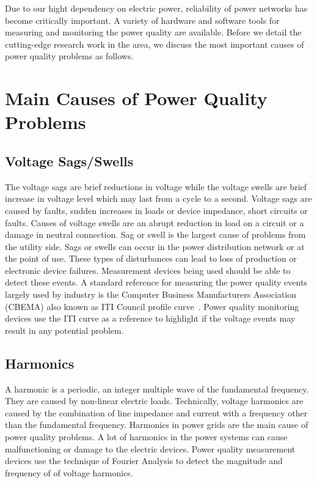 \label{chap:review}
Due to our hight dependency on electric power, reliability of power networks has become critically important. A variety of hardware and software tools for measuring and monitoring the power quality are available. Before we detail the cutting-edge research work in the area, we discuss the most important causes of power quality problems as follows.

\section{Main Causes of Power Quality Problems}
\subsection{Voltage Sags/Swells}
The voltage sags are brief reductions in voltage while the voltage swells are brief increase in voltage level which may last from a cycle to a second. Voltage sags are caused by faults, sudden increases in loads or device impedance, short circuits or faults. Causes of voltage swells are an abrupt reduction in load on a circuit or a damage in neutral connection. Sag or swell is the largest cause of problems from the utility side. Sags or swells can occur in the power distribution network or at the point of use. These types of disturbances can lead to loss of production or electronic device failures. Measurement devices being used should be able to detect these events. A standard reference for measuring the power quality events largely used by industry is the Computer Business Manufacturers Association (CBEMA) also known as ITI Council profile curve~\cite{iti_curve}. Power quality monitoring devices use the ITI curve as a reference to highlight if the voltage events may result in any potential problem.

\subsection{Harmonics}
A harmonic is a periodic, an integer multiple wave of the fundamental frequency. They are caused by non-linear electric loads. Technically, voltage harmonics are caused by the combination of line impedance and current with a frequency other than the fundamental frequency. Harmonics in power grids are the main cause of power quality problems. A lot of harmonics in the power systems can cause malfunctioning or damage to the electric devices. Power quality measurement devices use the technique of Fourier Analysis to detect the magnitude and frequency of of voltage harmonics.

